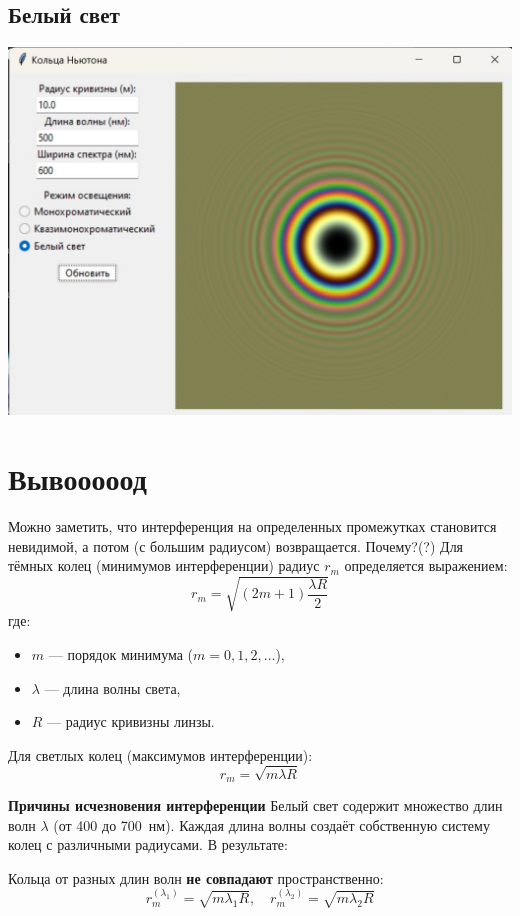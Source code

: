 \documentclass[a4paper,11pt]{article}
\theoremstyle{definition}
\begin{document}
    \subsection{Белый свет}
    \includegraphics[scale=0.7]{3. Newton's rings/demo results/whiteLight}


    \section{Вывооооод}
    Можно заметить, что интерференция на определенных промежутках становится невидимой, а потом (с большим радиусом) возвращается.
    Почему?(?)
    Для тёмных колец (минимумов интерференции) радиус $r_m$ определяется выражением:
    \[
        r_m = \sqrt{(2m + 1) \frac{\lambda R}{2}}
    \]
    где:
    \begin{itemize}
        \item $m$ — порядок минимума ($m = 0, 1, 2, \ldots$),
        \item $\lambda$ — длина волны света,
        \item $R$ — радиус кривизны линзы.
    \end{itemize}

    Для светлых колец (максимумов интерференции):
    \[
        r_m = \sqrt{m \lambda R}
    \]

    \textbf{Причины исчезновения интерференции}
    Белый свет содержит множество длин волн $\lambda$ (от 400 до 700~нм).
    Каждая длина волны создаёт собственную систему колец с различными радиусами. В результате:

    Кольца от разных длин волн \textbf{не совпадают} пространственно:
    \[
        r_m^{(\lambda_1)} = \sqrt{m \lambda_1 R}, \quad
        r_m^{(\lambda_2)} = \sqrt{m \lambda_2 R}
    \]
\end{document}
